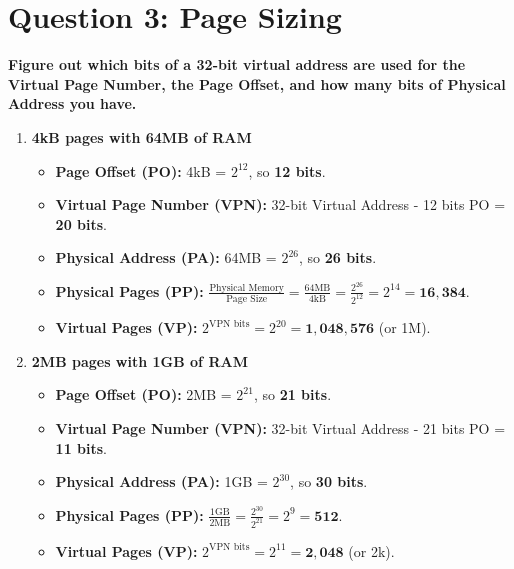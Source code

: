 \documentclass[12pt]{article}
\begin{document}
\vspace{0.5cm}

\section*{Question 3: Page Sizing}
\noindent \textbf{Figure out which bits of a 32-bit virtual address are used for the Virtual Page Number, the Page Offset, and how many bits of Physical Address you have.}

\begin{enumerate}[label=\textbf{\Alph*)}]
    \item \textbf{4kB pages with 64MB of RAM}
    \begin{itemize}
        \item \textbf{Page Offset (PO):} 4kB = $2^{12}$, so \textbf{12 bits}.
        \item \textbf{Virtual Page Number (VPN):} 32-bit Virtual Address - 12 bits PO = \textbf{20 bits}.
        \item \textbf{Physical Address (PA):} 64MB = $2^{26}$, so \textbf{26 bits}.
        \item \textbf{Physical Pages (PP):} $\frac{\text{Physical Memory}}{\text{Page Size}} = \frac{64\text{MB}}{4\text{kB}} = \frac{2^{26}}{2^{12}} = 2^{14} = \mathbf{16,384}$.
        \item \textbf{Virtual Pages (VP):} $2^{\text{VPN bits}} = 2^{20} = \mathbf{1,048,576}$ (or 1M).
    \end{itemize}

    \item \textbf{2MB pages with 1GB of RAM}
    \begin{itemize}
        \item \textbf{Page Offset (PO):} 2MB = $2^{21}$, so \textbf{21 bits}.
        \item \textbf{Virtual Page Number (VPN):} 32-bit Virtual Address - 21 bits PO = \textbf{11 bits}.
        \item \textbf{Physical Address (PA):} 1GB = $2^{30}$, so \textbf{30 bits}.
        \item \textbf{Physical Pages (PP):} $\frac{1\text{GB}}{2\text{MB}} = \frac{2^{30}}{2^{21}} = 2^9 = \mathbf{512}$.
        \item \textbf{Virtual Pages (VP):} $2^{\text{VPN bits}} = 2^{11} = \mathbf{2,048}$ (or 2k).
    \end{itemize}


\end{enumerate}
\end{document}
